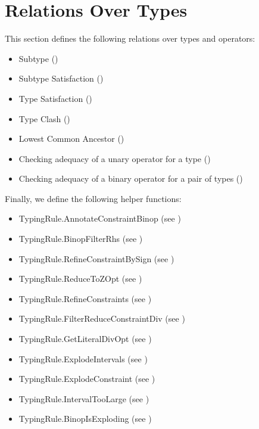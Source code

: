 \section{Relations Over Types\label{sec:RelationsOnTypes}}
This section defines the following relations over types and operators:
\begin{itemize}
  \item Subtype ()
  \item Subtype Satisfaction ()
  \item Type Satisfaction ()
  \item Type Clash ()
  \item Lowest Common Ancestor ()
  \item Checking adequacy of a unary operator for a type ()
  \item Checking adequacy of a binary operator for a pair of types ()
\end{itemize}

Finally, we define the following helper functions:
\begin{itemize}
  \item TypingRule.AnnotateConstraintBinop (see )
  \item TypingRule.BinopFilterRhs (see )
  \item TypingRule.RefineConstraintBySign (see )
  \item TypingRule.ReduceToZOpt (see )
  \item TypingRule.RefineConstraints (see )
  \item TypingRule.FilterReduceConstraintDiv (see )
  \item TypingRule.GetLiteralDivOpt (see )
  \item TypingRule.ExplodeIntervals (see )
  \item TypingRule.ExplodeConstraint (see )
  \item TypingRule.IntervalTooLarge (see )
  \item TypingRule.BinopIsExploding (see )
\end{itemize}

